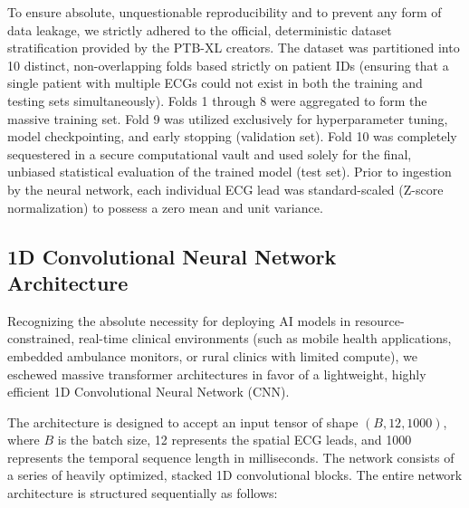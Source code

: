 \documentclass[10pt,twocolumn,letterpaper]{article}
\begin{document}
To ensure absolute, unquestionable reproducibility and to prevent any form of data leakage, we strictly adhered to the official, deterministic dataset stratification provided by the PTB-XL creators. The dataset was partitioned into 10 distinct, non-overlapping folds based strictly on patient IDs (ensuring that a single patient with multiple ECGs could not exist in both the training and testing sets simultaneously). Folds 1 through 8 were aggregated to form the massive training set. Fold 9 was utilized exclusively for hyperparameter tuning, model checkpointing, and early stopping (validation set). Fold 10 was completely sequestered in a secure computational vault and used solely for the final, unbiased statistical evaluation of the trained model (test set). Prior to ingestion by the neural network, each individual ECG lead was standard-scaled (Z-score normalization) to possess a zero mean and unit variance.

\subsection{1D Convolutional Neural Network Architecture}
Recognizing the absolute necessity for deploying AI models in resource-constrained, real-time clinical environments (such as mobile health applications, embedded ambulance monitors, or rural clinics with limited compute), we eschewed massive transformer architectures in favor of a lightweight, highly efficient 1D Convolutional Neural Network (CNN). 

The architecture is designed to accept an input tensor of shape $(B, 12, 1000)$, where $B$ is the batch size, 12 represents the spatial ECG leads, and 1000 represents the temporal sequence length in milliseconds. The network consists of a series of heavily optimized, stacked 1D convolutional blocks. The entire network architecture is structured sequentially as follows:
\end{document}
